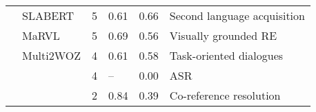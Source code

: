 \begin{tabular}{llrlll}
	\citet{yadavalli-etal-2023-slabert}           & SLABERT                & 5                               & 0.61                          & 0.66                          & Second language acquisition         \\
	\citet{liu-etal-2021-visually}                & MaRVL                  & 5                               & 0.69                          & 0.56                          & Visually grounded RE                \\
	\citet{hung-etal-2022-multi2woz}              & Multi2WOZ              & 4                               & 0.61                          & 0.58                          & Task-oriented dialogues             \\
	\citet{bartelds-etal-2023-making}             &                        & 4                               & --\lowcov                     & \cellcolor{low-color!40}0.00  & ASR                                 \\
	\citet{sasaki-etal-2002-co}                   &                        & 2                               & \cellcolor{high-color!40}0.84 & 0.39                          & Co-reference resolution             \\
	\bottomrule
\end{tabular}
